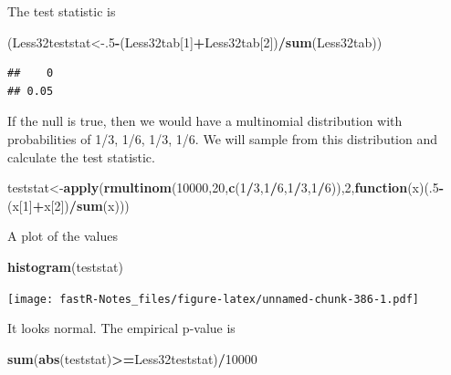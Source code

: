 \documentclass[]{book}
\newenvironment{Shaded}{\begin{snugshade}}{\end{snugshade}}
\newcommand{\KeywordTok}[1]{\textcolor[rgb]{0.13,0.29,0.53}{\textbf{#1}}}
\newcommand{\DecValTok}[1]{\textcolor[rgb]{0.00,0.00,0.81}{#1}}
\newcommand{\ControlFlowTok}[1]{\textcolor[rgb]{0.13,0.29,0.53}{\textbf{#1}}}
\newcommand{\OperatorTok}[1]{\textcolor[rgb]{0.81,0.36,0.00}{\textbf{#1}}}
\newcommand{\NormalTok}[1]{#1}
\theoremstyle{definition}
\theoremstyle{definition}
\theoremstyle{definition}
\theoremstyle{remark}
\begin{document}
The test statistic is

\begin{Shaded}
\begin{Highlighting}[]
\NormalTok{(Less32teststat<-.}\DecValTok{5}\OperatorTok{-}\NormalTok{(Less32tab[}\DecValTok{1}\NormalTok{]}\OperatorTok{+}\NormalTok{Less32tab[}\DecValTok{2}\NormalTok{])}\OperatorTok{/}\KeywordTok{sum}\NormalTok{(Less32tab))}
\end{Highlighting}
\end{Shaded}

\begin{verbatim}
##    0 
## 0.05
\end{verbatim}

If the null is true, then we would have a multinomial distribution with
probabilities of 1/3, 1/6, 1/3, 1/6. We will sample from this
distribution and calculate the test statistic.

\begin{Shaded}
\begin{Highlighting}[]
\NormalTok{teststat<-}\KeywordTok{apply}\NormalTok{(}\KeywordTok{rmultinom}\NormalTok{(}\DecValTok{10000}\NormalTok{,}\DecValTok{20}\NormalTok{,}\KeywordTok{c}\NormalTok{(}\DecValTok{1}\OperatorTok{/}\DecValTok{3}\NormalTok{,}\DecValTok{1}\OperatorTok{/}\DecValTok{6}\NormalTok{,}\DecValTok{1}\OperatorTok{/}\DecValTok{3}\NormalTok{,}\DecValTok{1}\OperatorTok{/}\DecValTok{6}\NormalTok{)),}\DecValTok{2}\NormalTok{,}\ControlFlowTok{function}\NormalTok{(x)(.}\DecValTok{5}\OperatorTok{-}\NormalTok{(x[}\DecValTok{1}\NormalTok{]}\OperatorTok{+}\NormalTok{x[}\DecValTok{2}\NormalTok{])}\OperatorTok{/}\KeywordTok{sum}\NormalTok{(x)))}
\end{Highlighting}
\end{Shaded}

A plot of the values

\begin{Shaded}
\begin{Highlighting}[]
\KeywordTok{histogram}\NormalTok{(teststat)}
\end{Highlighting}
\end{Shaded}

\texttt{[image: fastR-Notes\_files/figure-latex/unnamed-chunk-386-1.pdf]}

It looks normal. The empirical p-value is

\begin{Shaded}
\begin{Highlighting}[]
\KeywordTok{sum}\NormalTok{(}\KeywordTok{abs}\NormalTok{(teststat)}\OperatorTok{>=}\NormalTok{Less32teststat)}\OperatorTok{/}\DecValTok{10000}
\end{Highlighting}
\end{Shaded}
\end{document}
